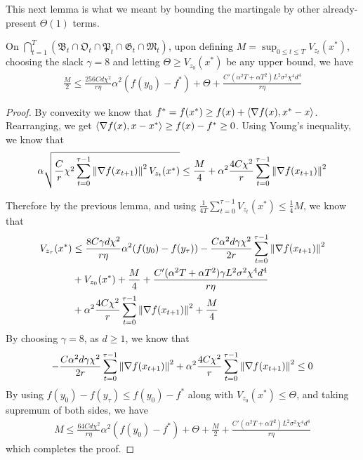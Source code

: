 This next lemma is what we meant by bounding the martingale by other already-present $\Theta(1)$ terms. 
\begin{lemma}
    On $\bigcap_{t=1}^{T} (\mathfrak B_t \cap \mathfrak O_t \cap \mathfrak P_t \cap \mathfrak G_t \cap \mathfrak M_t)$, upon defining $M = \sup_{0 \leq t \leq T} V_{z_t}(x^*)$, choosing the slack $\gamma = 8$ and letting $\Theta \geq V_{z_0}(x^*)$ be any upper bound, we have
    \begin{align*}
        \frac{M}{2} \leq \frac{256Cd\chi^2}{r\eta}\alpha^2 (f(y_0) - f^*) + \Theta + \frac{C'(\alpha^2 T + \alpha T^2) L^2 \sigma^2 \chi^4 d^4}{r\eta}
    \end{align*}
\end{lemma}

\begin{proof}
    By convexity we know that $f^* = f(x^*) \geq f(x) + \langle \nabla f(x), x^* - x \rangle$. Rearranging, we get $\langle \nabla f(x), x-x^* \rangle \geq f(x) - f^* \geq 0$. Using Young's inequality, we know that
    \begin{align*}
        \alpha \sqrt{\frac{C}{r} \chi^2 \sum_{t=0}^{\tau-1} \left\lVert \nabla f(x_{t+1}) \right\rVert^2 V_{z_t}(x^*)} \leq \frac{M}{4} + \alpha^2 \frac{4C\chi^2}{r} \sum_{t=0}^{\tau-1} \left\lVert \nabla f(x_{t+1}) \right\rVert^2
    \end{align*}
    
    Therefore by the previous lemma, and using $\frac{1}{4T}\sum_{t=0}^{\tau-1} V_{z_t}(x^*) \leq \frac14 M$, we know that
    \begin{align*}
        V_{z_\tau}(x^*) &\leq \frac{8C\gamma d\chi^2}{r\eta} \alpha^2 (f(y_0) - f(y_\tau)) - \frac{C\alpha^2 d \gamma \chi^2}{2r} \sum_{t=0}^{\tau-1} \left\lVert \nabla f(x_{t+1}) \right\rVert^2 \\
        &+ V_{z_0}(x^*) + \frac{M}{4} + \frac{C'(\alpha^2 T + \alpha T^2)\gamma L^2 \sigma^2 \chi^4 d^4}{r\eta} 
        \\&+ \alpha^2 \frac{4C\chi^2}{r} \sum_{t=0}^{\tau-1} \left\lVert \nabla f(x_{t+1}) \right\rVert^2 + \frac{M}{4}
    \end{align*}
    By choosing $\gamma = 8$, as $d \geq 1$, we know that
    \begin{align*}
        - \frac{C\alpha^2 d \gamma \chi^2}{2r} \sum_{t=0}^{\tau-1} \left\lVert \nabla f(x_{t+1}) \right\rVert^2 + \alpha^2 \frac{4C\chi^2}{r} \sum_{t=0}^{\tau-1} \left\lVert \nabla f(x_{t+1}) \right\rVert^2 \leq 0
    \end{align*}
    By using $f(y_0) - f(y_\tau) \leq f(y_0) - f^*$ along with $V_{z_0}(x^*) \leq \Theta$, and taking supremum of both sides, we have
    \begin{align*}
        M \leq \frac{64 C d \chi^2}{r\eta}\alpha^2 (f(y_0) - f^*) + \Theta + \frac{M}{2} + \frac{C'(\alpha^2 T + \alpha T^2) L^2 \sigma^2 \chi^4 d^4}{r\eta} 
    \end{align*}
    which completes the proof.
\end{proof}


